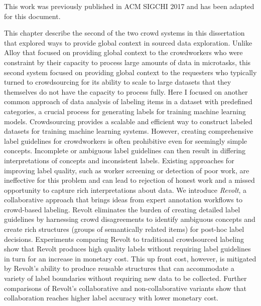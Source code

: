 
{\rmfamily
This work was previously published in ACM SIGCHI 2017 \cite{Chang:2017:Revolt} and has been adapted for this document.
}

This chapter describe the second of the two crowd systems in this dissertation that explored ways to provide global context in sourced data exploration. Unlike Alloy that focused on providing global context to the crowdworkers who were constraint by their capacity to process large amounts of data in microtasks, this second system focused on providing global context to the requesters who typically turned to crowdsourcing for its ability to scale to large datasets that they themselves do not have the capacity to process fully.
Here I focused on another common approach of data analysis of labeling items in a dataset with predefined categories, a crucial process for generating labels for training machine learning models.
Crowdsourcing provides a scalable and efficient way to construct labeled datasets for training machine learning systems. However, creating comprehensive label guidelines for crowdworkers is often prohibitive even for seemingly simple concepts. Incomplete or ambiguous label guidelines can then result in differing interpretations of concepts and inconsistent labels. Existing approaches for improving label quality, such as worker screening or detection of poor work, are ineffective for this problem and can lead to rejection of honest work and a missed opportunity to capture rich interpretations about data. We introduce \emph{Revolt}, a collaborative approach that brings ideas from expert annotation workflows to crowd-based labeling. Revolt eliminates the burden of creating detailed label guidelines by harnessing crowd disagreements to identify ambiguous concepts and create rich structures (groups of semantically related items) for post-hoc label decisions. Experiments comparing Revolt to traditional crowdsourced labeling show that Revolt produces high quality labels without requiring label guidelines in turn for an increase in monetary cost. This up front cost, however, is mitigated by Revolt's ability to produce reusable structures that can accommodate a variety of label boundaries without requiring new data to be collected. Further comparisons of Revolt's collaborative and non-collaborative variants show that collaboration reaches higher label accuracy with lower monetary cost.\cite{Chang:2017:Revolt}


